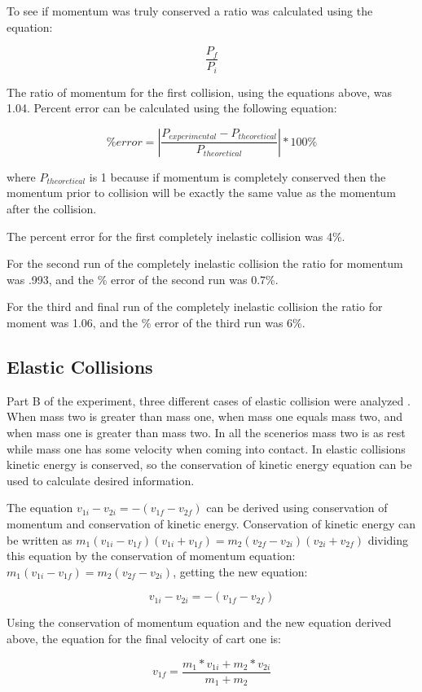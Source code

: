 \documentclass[aps,letterpaper,11pt]{revtex4}
\begin{document}
To see if momentum was truly conserved a ratio was calculated using the equation:

$$ \frac{P_f}{P_{i}}$$

The ratio of momentum for the first collision, using the equations above, was 1.04. Percent error can be calculated using the following equation:

$$ \% error = |\frac{P_{experimental} - P_{theoretical}}{P_{theoretical}}|*100\%$$

where $P_{theoretical}$ is 1 because if momentum is completely conserved then the momentum prior to collision will be exactly the same value as the momentum after the collision. 

The percent error for the first completely inelastic collision was 4\%.

For the second run of the completely inelastic collision the ratio for momentum was .993, and the \% error of the second run was 0.7\%. 

For the third and final run of the completely inelastic collision the ratio for moment was 1.06, and the \% error of the third run was 6\%. 

\subsection{Elastic Collisions}

Part B of the experiment, three different cases of elastic collision were analyzed . When mass two is greater than mass one, when mass one equals mass two, and when mass one is greater than mass two. In  all the scenerios mass two is as rest while mass one has some velocity when coming into contact. In elastic collisions kinetic energy is conserved, so the conservation of kinetic energy equation can be used to calculate desired information. 

The equation $v_{1i} - v_{2i} = -(v_{1f}- v_{2f})$ can be derived using conservation of momentum and conservation of kinetic energy. Conservation of kinetic energy can be written as $m_1(v_{1i}-v_{1f})(v_{1i} + v_{1f})=m_2(v_{2f}-v_{2i})(v_{2i}+v_{2f})$ dividing this equation by the conservation of momentum equation: $m_1(v_{1i}-v_{1f}) = m_2(v_{2f}-v_{2i})$, getting the new equation:

$$v_{1i} - v_{2i} = -(v_{1f}- v_{2f}) $$   

Using the conservation of momentum equation and the new equation derived above, the equation for the final velocity of cart one is:

$$ v_{1f} = \frac{m_1*v_{1i}+m_2*v_{2i}}{m_1+m_2}$$
\end{document}
